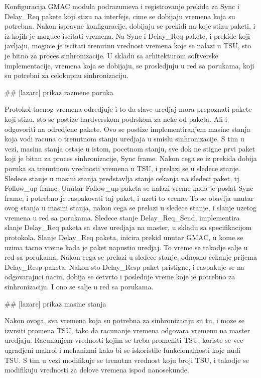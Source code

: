 \documentclass[a4paper,12pt, master]{etf}
\begin{document}
        Konfiguracija GMAC modula podrazumeva i registrovanje prekida za Sync i Delay\_Req pakete koji stizu na
        interfejs, cime se dobijaju vremena koja su potrebna. Nakon ispravne konfiguracije, dobijaju se prekidi
        na koje stizu paketi, i iz kojih je moguce iscitati vremena. Na Sync i Delay\_Req pakete, i prekide koji
        javljaju, moguce je iscitati trenutnu vrednost vremena koje se nalazi u TSU, sto je bitno za proces
        sinhronizacije. U skladu sa arhitekturom softverske implementacije, vremena koja se dobijaju, se
        prosledjuju u red sa porukama, koji su potrebni za celokupnu sinhronizaciju.

        \#\# [lazarc] prikaz razmene poruka

        Protokol tacnog vremena odredjuje i to da slave uredjaj mora prepoznati pakete koji stizu, sto se postize
        hardverskom podrskom za neke od paketa. Ali i odgovoriti na odredjene pakete. Ovo se postize
        implementiranjem masine stanja koja vodi racuna o trenutnom stanju uredjaja u smislu sinhronizacije. S
        tim u vezi, masina stanja ostaje u istom, pocetnom stanju, sve dok ne stigne prvi paket koji je bitan za
        proces sinhronizacije, Sync frame. Nakon cega se iz prekida dobija poruka sa trenutnom vrednosti vremena
        u TSU, i prelazi se u sledece stanje. Sledece stanje u masini stanja predstavlja stanje cekanja na
        sledeci paket, tj. Follow\_up frame. Unutar Follow\_up paketa se nalazi vreme kada je poslat Sync frame,
        i potrebno je raspakovati taj paket, i uzeti to vreme. To se obavlja unutar ovog stanja u masini stanja,
        nakon cega se prelazi u sledece stanje, i slanje uzetog vremena u red sa porukama. Sledece stanje
        Delay\_Req\_Send, implementira slanje Delay\_Req paketa sa slave uredjaja na master, u skladu sa
        specifikacijom protokola. Slanje Delay\_Req paketa, inicira prekid unutar GMAC, u kome se uzima tacno
        vreme kada je paket napustio uredjaj. To vreme se takodje salje u red sa porukama. Nakon cega se prelazi
        u sledece stanje, odnosno cekanje prijema Delay\_Resp paketa. Nakon sto Delay\_Resp paket pristigne, i
        raspakuje se na odgovarajuci nacin, dobija se cetvrto i poslednje vreme koje je potrebno za
        sinhronizaciju. I ono se salje u red sa porukama.

        \#\# [lazarc] prikaz masine stanja

        Nakon ovoga, sva vremena koja su potrebna za sinhronizaciju su tu, i moze se izvrsiti promena TSU, tako
        da racunanje vremena odgovara vremenu na master uredjaju. Racunanjem vrednosti kojim se treba promeniti
        TSU, koriste se vec ugradjeni makroi i mehanizmi kako bi se iskoristile funkcionalnosti koje nudi TSU\@. S
        tim u vezi modifikuje se trenutna vrednost koju broji TSU, i takodje se modifikuju vrednosti za delove
        vremena ispod nanosekunde.
\end{document}
